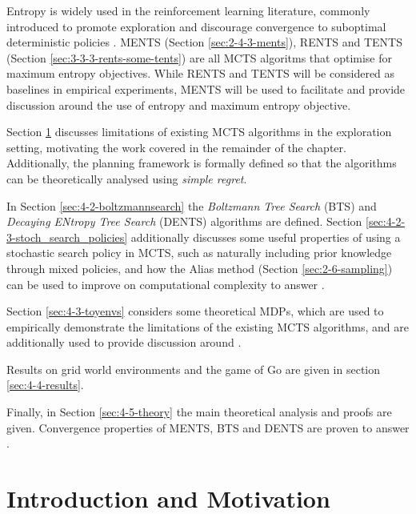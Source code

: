     Entropy is widely used in the reinforcement learning literature, commonly introduced to promote exploration and discourage convergence to suboptimal deterministic policies \cite{ppo,deep_energy_policies,a3c,reinforce_ment}. MENTS (Section \ref{sec:2-4-3-ments}), RENTS and TENTS (Section \ref{sec:3-3-3-rents-some-tents}) are all MCTS algoritms that optimise for maximum entropy objectives. While RENTS and TENTS will be considered as baselines in empirical experiments, MENTS will be used to facilitate and provide discussion around the use of entropy and maximum entropy objective.

    Section \ref{sec:4-1-intro} discusses limitations of existing MCTS algorithms in the exploration setting, motivating the work covered in the remainder of the chapter. Additionally, the planning framework is formally defined so that the algorithms can be theoretically analysed using \textit{simple regret}.
    
    In Section \ref{sec:4-2-boltzmannsearch} the \textit{Boltzmann Tree Search} (BTS) and \textit{Decaying ENtropy Tree Search} (DENTS) algorithms are defined. Section \ref{sec:4-2-3-stoch_search_policies} additionally discusses some useful properties of using a stochastic search policy in MCTS, such as naturally including prior knowledge through mixed policies, and how the Alias method (Section \ref{sec:2-6-sampling}) can be used to improve on computational complexity to answer \complexityq.

    Section \ref{sec:4-3-toyenvs} considers some theoretical MDPs, which are used to empirically demonstrate the limitations of the existing MCTS algorithms, and are additionally used to provide discussion around \entropyq.

    Results on grid world environments and the game of Go are given in section \ref{sec:4-4-results}. 

    Finally, in Section \ref{sec:4-5-theory} the main theoretical analysis and proofs are given. Convergence properties of MENTS, BTS and DENTS are proven to answer \entropyq.

    







\section{Introduction and Motivation}
\label{sec:4-1-intro}

